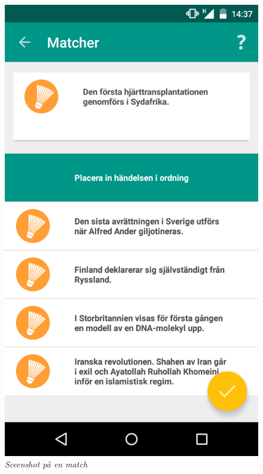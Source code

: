 \documentclass[a4paper, 11pt]{article}
\begin{document}
\begin{enumerate}
\begin{figure}[H]
	\begin{centering}
	\includegraphics[width=\textwidth]{app_match} 
	\end{centering}
	\caption{\textit{Sceenshot på en match}}
\end{figure}




\end{enumerate}
\end{document}
